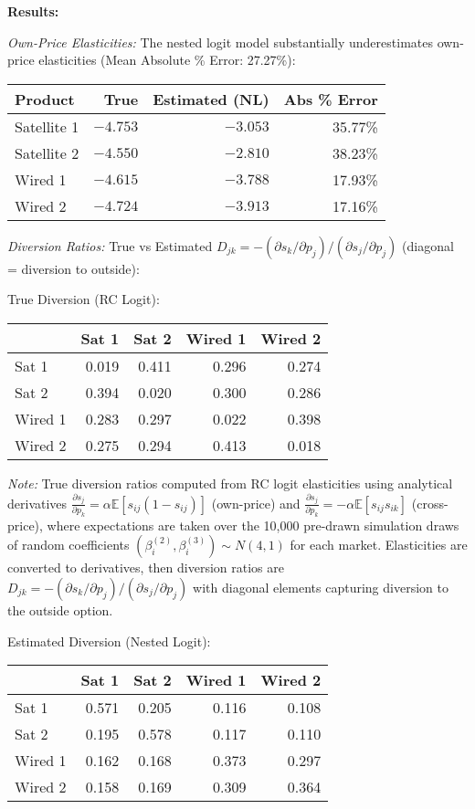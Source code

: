 \documentclass[english,11pt]{article}
\begin{document}
\begin{enumerate}
\textbf{Results:}

\textit{Own-Price Elasticities:} The nested logit model substantially underestimates own-price elasticities (Mean Absolute \% Error: 27.27\%):

\begin{center}
\begin{tabular}{lrrr}
\hline
Product & True & Estimated (NL) & Abs \% Error \\
\hline
Satellite 1 & $-4.753$ & $-3.053$ & 35.77\% \\
Satellite 2 & $-4.550$ & $-2.810$ & 38.23\% \\
Wired 1 & $-4.615$ & $-3.788$ & 17.93\% \\
Wired 2 & $-4.724$ & $-3.913$ & 17.16\% \\
\hline
\end{tabular}
\end{center}

\textit{Diversion Ratios:} True vs Estimated $D_{jk} = -(\partial s_k/\partial p_j) / (\partial s_j/\partial p_j)$ (diagonal = diversion to outside):

True Diversion (RC Logit):
\begin{center}
\begin{tabular}{lrrrr}
\hline
 & Sat 1 & Sat 2 & Wired 1 & Wired 2 \\
\hline
Sat 1 & 0.019 & 0.411 & 0.296 & 0.274 \\
Sat 2 & 0.394 & 0.020 & 0.300 & 0.286 \\
Wired 1 & 0.283 & 0.297 & 0.022 & 0.398 \\
Wired 2 & 0.275 & 0.294 & 0.413 & 0.018 \\
\hline
\end{tabular}
\end{center}

\textit{Note:} True diversion ratios computed from RC logit elasticities using analytical derivatives $\frac{\partial s_j}{\partial p_k} = \alpha \mathbb{E}[s_{ij}(1-s_{ij})]$ (own-price) and $\frac{\partial s_j}{\partial p_k} = -\alpha \mathbb{E}[s_{ij}s_{ik}]$ (cross-price), where expectations are taken over the 10,000 pre-drawn simulation draws of random coefficients $(\beta_i^{(2)}, \beta_i^{(3)}) \sim N(4,1)$ for each market. Elasticities are converted to derivatives, then diversion ratios are $D_{jk} = -(\partial s_k/\partial p_j) / (\partial s_j/\partial p_j)$ with diagonal elements capturing diversion to the outside option.

Estimated Diversion (Nested Logit):
\begin{center}
\begin{tabular}{lrrrr}
\hline
 & Sat 1 & Sat 2 & Wired 1 & Wired 2 \\
\hline
Sat 1 & 0.571 & 0.205 & 0.116 & 0.108 \\
Sat 2 & 0.195 & 0.578 & 0.117 & 0.110 \\
Wired 1 & 0.162 & 0.168 & 0.373 & 0.297 \\
Wired 2 & 0.158 & 0.169 & 0.309 & 0.364 \\
\hline
\end{tabular}
\end{center}


\end{enumerate}
\end{document}
